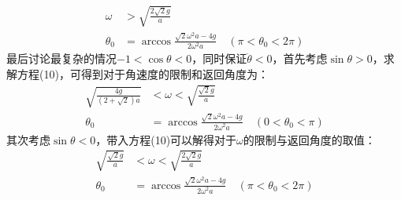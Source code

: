 \documentclass[a4paper]{ctexart}
\begin{document}
    \begin{align}
        \omega &> \sqrt{\frac{2\sqrt{2}g}{a}}\\
        \theta_{0} &= \arccos\frac{\sqrt{2}\omega^{2}a - 4g}{2\omega^{2}a}\quad(\pi < \theta_{0} < 2\pi)
    \end{align}
    最后讨论最复杂的情况$-1 < \cos\theta < 0$，同时保证$\ddot{\theta} < 0$，首先考虑$\sin\theta > 0$，求解方程(10)，可得到对于角速度的限制和返回角度为：
    \begin{align}
        \sqrt{\frac{4g}{(2 + \sqrt{2})a}} &< \omega < \sqrt{\frac{\sqrt{2}g}{a}}\\
        \theta_{0} &= \arccos\frac{\sqrt{2}\omega^{2}a - 4g}{2\omega^{2}a}\quad(0 < \theta_{0} < \pi)
    \end{align}
    其次考虑$\sin\theta < 0$，带入方程(10)可以解得对于$\omega$的限制与返回角度的取值：
    \begin{align}
        \sqrt{\frac{\sqrt{2}g}{a}} &< \omega < \sqrt{\frac{2\sqrt{2}g}{a}}\\
        \theta_{0} &= \arccos\frac{\sqrt{2}\omega^{2}a - 4g}{2\omega^{2}a}\quad(\pi < \theta_{0} < 2\pi)
    \end{align}
\end{document}
